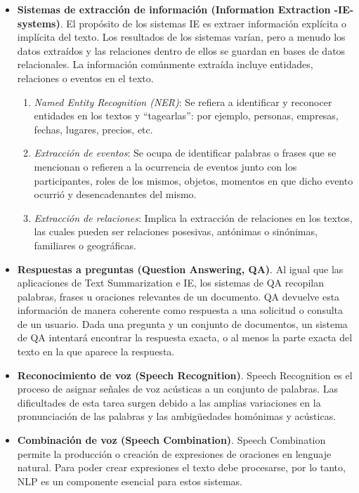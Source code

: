 \documentclass[12pt,a4paper]{article}
\begin{document}
\begin{sloppypar}
\begin{itemize}
\item \textbf{Sistemas de extracción de información (Information Extraction -IE- systems)}. El propósito de los sistemas IE es extraer información explícita o implícita del texto. Los resultados de los sistemas varían, pero a menudo los datos extraídos y las relaciones dentro de ellos se guardan en bases de datos relacionales. La información comúnmente extraída incluye entidades, relaciones o eventos en el texto. 

\begin{enumerate}
\item \textit{Named Entity Recognition (NER)}: Se refiera a identificar y reconocer entidades en los textos y “tagearlas”: por ejemplo, personas, empresas, fechas, lugares, precios, etc.
\item \textit{Extracción de eventos}: Se ocupa de identificar palabras o frases que se mencionan o refieren a la ocurrencia de eventos junto con los participantes, roles de los mismos, objetos, momentos en que dicho evento ocurrió y desencadenantes del mismo.
\item \textit{Extracción de relaciones}: Implica la extracción de relaciones en los textos, las cuales pueden ser relaciones posesivas, antónimas o sinónimas, familiares o geográficas.
\end{enumerate}

\item \textbf{Respuestas a preguntas (Question Answering, QA)}. Al igual que las aplicaciones de Text Summarization e IE, los sistemas de QA recopilan palabras, frases u oraciones relevantes de un documento. QA devuelve esta información de manera coherente como respuesta a una solicitud o consulta de un usuario. Dada una pregunta y un conjunto de documentos, un sistema de QA intentará encontrar la respuesta exacta, o al menos la parte exacta del texto en la que aparece la respuesta.

\item \textbf{Reconocimiento de voz (Speech Recognition)}. Speech Recognition es el proceso de asignar señales de voz acústicas a un conjunto de palabras. Las dificultades de esta tarea surgen debido a las amplias variaciones en la pronunciación de las palabras y las ambigüedades homónimas y acústicas.

\item \textbf{Combinación de voz (Speech Combination)}. Speech Combination permite la producción o creación de expresiones de oraciones en lenguaje natural. Para poder crear expresiones el texto debe procesarse, por lo tanto, NLP es un componente esencial para estos sistemas.


\end{itemize}
\end{sloppypar}
\end{document}
